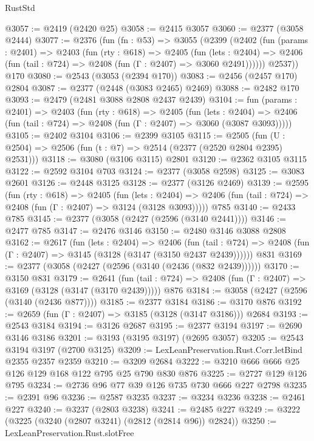\begin{lexlean}{RustStd}
\begin{coremodule}
@3057 := @2419 (@2420 @25)
@3058 := @2415 @3057
@3060 := @2377 (@3058 @2444)
@3077 := @2376
    (fun (fn : @53) =>
    @3055
      (@2399
        (@2402
          (fun (params : @2401) =>
          @2403
            (fun (rty : @618) =>
            @2405
              (fun (lets : @2404) =>
              @2406 (fun (tail : @724) => @2408 (fun (Γ : @2407) => @3060 @2491))))))
        @2537))
    @170
@3080 := @2543 (@3053 (@2394 @170))
@3083 := @2456 (@2457 @170) @2804
@3087 := @2377 (@2448 (@3083 @2465) @2469)
@3088 := @2482 @170
@3093 := @2479 (@2481 @3088 @2808 @2437 @2439)
@3104 := fun (params : @2401) =>
  @2403
    (fun (rty : @618) =>
    @2405
      (fun (lets : @2404) =>
      @2406 (fun (tail : @724) => @2408 (fun (Γ : @2407) => @3060 (@3087 @3093)))))
@3105 := @2402 @3104
@3106 := @2399 @3105
@3115 := @2505 (fun (U : @2504) => @2506 (fun (t : @7) => @2514 (@2377 (@2520 @2804 @2395) @2531)))
@3118 := @3080 (@3106 @3115) @2801
@3120 := @2362 @3105 @3115
@3122 := @2592 @3104 @703
@3124 := @2377 (@3058 @2598)
@3125 := @3083 @2601
@3126 := @2448 @3125
@3128 := @2377 (@3126 @2469)
@3139 := @2595
    (fun (rty : @618) =>
    @2405
      (fun (lets : @2404) =>
      @2406 (fun (tail : @724) => @2408 (fun (Γ : @2407) => @3124 (@3128 @3093)))))
    @785
@3140 := @2433 @785
@3145 := @2377 (@3058 (@2427 (@2596 (@3140 @2441))))
@3146 := @2477 @785
@3147 := @2476 @3146
@3150 := @2480 @3146 @3088 @2808
@3162 := @2617
    (fun (lets : @2404) =>
    @2406
      (fun (tail : @724) => @2408 (fun (Γ : @2407) => @3145 (@3128 (@3147 (@3150 @2437 @2439))))))
    @831
@3169 := @2377 (@3058 (@2427 (@2596 (@3140 (@2436 (@832 @2439))))))
@3170 := @3150 @831
@3179 := @2641
    (fun (tail : @724) => @2408 (fun (Γ : @2407) => @3169 (@3128 (@3147 (@3170 @2439)))))
    @876
@3184 := @3058 (@2427 (@2596 (@3140 (@2436 @877))))
@3185 := @2377 @3184
@3186 := @3170 @876
@3192 := @2659 (fun (Γ : @2407) => @3185 (@3128 (@3147 @3186))) @2684
@3193 := @2543 @3184
@3194 := @3126 @2687
@3195 := @2377 @3194
@3197 := @2690 @3146 @3186
@3201 := @3193 (@3195 @3197) (@2695 @3057)
@3205 := @2543 @3194 @3197 (@2700 @3125)
@3209 := LexLeanPreservation.Rust.Corr.letBind @2355 @2357 @2359
@3210 := @3209 @2684
@3222 := @3210 @666 @666 @25 @126 @129 @168 @122 @795 @25 @790 @830 @876
@3225 := @2727 @129 @126 @795
@3234 := @2736 @96 @77 @39 @126 @735 @730 @666 @227 @2798
@3235 := @2391 @96
@3236 := @2587 @3235
@3237 := @3234 @3236
@3238 := @2461 @227
@3240 := @3237 (@2803 @3238)
@3241 := @2485 @227
@3249 := @3222 (@3225 (@3240 (@2807 @3241) (@2812 (@2814 @96)) @2824))
@3250 := LexLeanPreservation.Rust.slotFree

\end{coremodule}
\end{lexlean}
